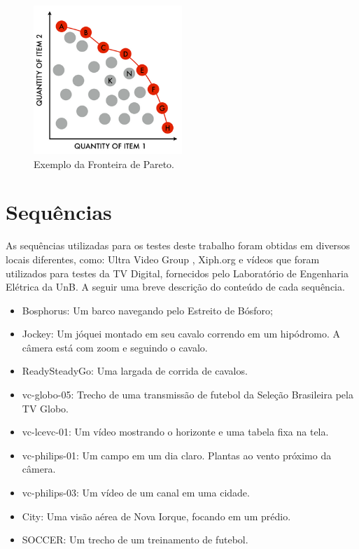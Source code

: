 \begin{figure}[t]
    \centering
    \includegraphics[width=0.5\textwidth]{img/pareto-2.png}
    \caption{Exemplo da Fronteira de Pareto. \cite{pareto_img}}
    \label{fig:pareto}
\end{figure}

\section{Sequências}

As sequências utilizadas para os testes deste trabalho foram obtidas em diversos locais diferentes,
como: Ultra Video Group \cite{uvg_dataset}, Xiph.org \cite{xiph} e vídeos que foram utilizados para
testes da TV Digital, fornecidos pelo Laboratório de Engenharia Elétrica da UnB. A seguir uma breve
descrição do conteúdo de cada sequência.

\begin{itemize}
    \item Bosphorus: Um barco navegando pelo Estreito de Bósforo;
    \item Jockey: Um jóquei montado em seu cavalo correndo em um hipódromo. A câmera está com zoom e 
    seguindo o cavalo.
    \item ReadySteadyGo: Uma largada de corrida de cavalos.
    \item vc-globo-05: Trecho de uma transmissão de futebol da Seleção Brasileira pela TV Globo.
    \item vc-lcevc-01: Um vídeo mostrando o horizonte e uma tabela fixa na tela.
    \item vc-philips-01: Um campo em um dia claro. Plantas ao vento próximo da câmera.
    \item vc-philips-03: Um vídeo de um canal em uma cidade.
    \item City: Uma visão aérea de Nova Iorque, focando em um prédio.
    \item SOCCER: Um trecho de um treinamento de futebol.
\end{itemize}

